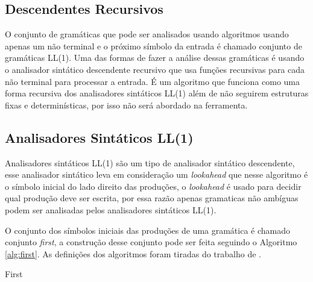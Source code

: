 \subsection{Descendentes Recursivos}
O conjunto de gramáticas que pode ser analisados usando algoritmos usando apenas um não terminal e o próximo símbolo da entrada é chamado conjunto de gramáticas LL(1). Uma das formas de fazer a análise dessas gramáticas é usando o analisador sintático descendente recursivo que usa funções recursivas para cada não terminal para processar a entrada. É um algoritmo que funciona como uma forma recursiva dos analisadores sintáticos LL(1) além de não seguirem estruturas fixas e determinísticas, por isso não será abordado na ferramenta.

\subsection{Analisadores Sintáticos LL(1)} 
Analisadores sintáticos LL(1) são um tipo de analisador sintático descendente, esse analisador sintático leva em consideração um \textit{lookahead} que nesse algoritmo é o símbolo inicial do lado direito das produções, o \textit{lookahead} é usado para decidir qual produção deve ser escrita, por essa razão apenas gramaticas não ambíguas podem ser analisadas pelos analisadores sintáticos LL(1).

O conjunto dos símbolos iniciais das produções de uma gramática é chamado conjunto \textit{first}, a construção desse conjunto pode ser feita seguindo o Algoritmo \ref{alg:first}. As definições dos algoritmos foram tiradas do trabalho de \textcite{thain2020introduction}.


\begin{algorithm}[htp]
    \caption{First}\label{alg:first}
\end{algorithm}

